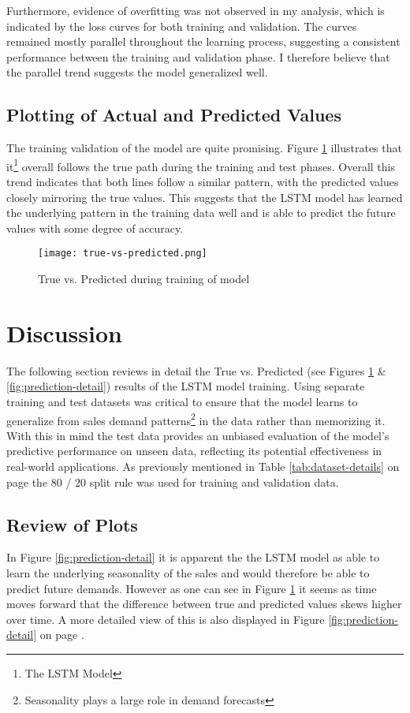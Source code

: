 \documentclass[10pt, journal, letterpaper, compsoc]{IEEEtran}
\begin{document}
Furthermore, evidence of overfitting was not observed in my analysis, which is indicated by the loss curves for both training and validation. The curves remained mostly parallel throughout the learning process, suggesting a consistent performance between the training and validation phase. I therefore believe that the parallel trend suggests the model generalized well.


\subsection{Plotting of Actual and Predicted Values}
The training validation of the model are quite promising. Figure \ref{fig:true-vs-predicted} illustrates that it\footnote{The LSTM Model} overall follows the true path during the training and test phases. Overall this trend indicates that both lines follow a similar pattern, with the predicted values closely mirroring the true values. This suggests that the LSTM model has learned the underlying pattern in the training data well and is able to predict the future values with some degree of accuracy.

\begin{figure}[h]
\centering
\captionsetup{justification=centering,margin=1cm}
\texttt{[image: true-vs-predicted.png]}
\caption{True vs. Predicted during training of model}
\label{fig:true-vs-predicted}
\end{figure}



\section{Discussion}
The following section reviews in detail the True vs. Predicted (see Figures \ref{fig:true-vs-predicted} \& \ref{fig:prediction-detail}) results of the LSTM model training. Using separate training and test datasets was critical to ensure that the model learns to generalize from sales demand patterns\footnote{Seasonality plays a large role in demand forecasts} in the data rather than memorizing it. With this in mind the test data provides an unbiased evaluation of the model's predictive performance on unseen data, reflecting its potential effectiveness in real-world applications. As previously mentioned in Table \ref{tab:dataset-details} on page \pageref{tab:dataset-details} the 80 / 20 split rule was used for training and validation data.

\subsection{Review of Plots}
In Figure \ref{fig:prediction-detail} it is apparent the the LSTM model as able to learn the underlying seasonality of the sales and would therefore be able to predict future demands. However as one can see in Figure \ref{fig:true-vs-predicted} it seems as time moves forward that the difference between true and predicted values skews higher over time. A more detailed view of this is also displayed in Figure \ref{fig:prediction-detail} on page \pageref{fig:prediction-detail}. 
\end{document}
